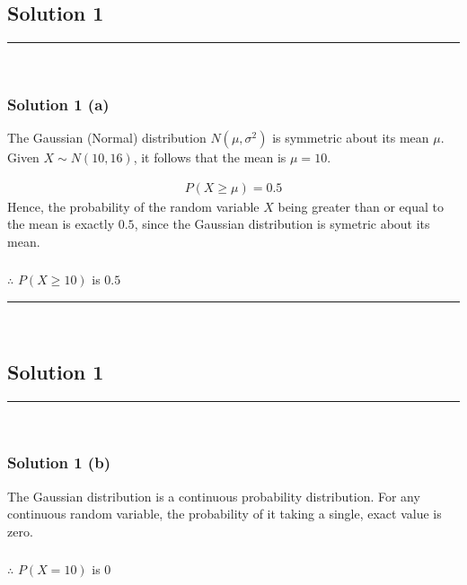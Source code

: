 \documentclass{article}
\begin{document}
\pagestyle{fancy}

\subsection*{Solution 1}
\noindent\rule{\textwidth}{0.4pt}\\
\subsubsection*{Solution 1 (a)}
The Gaussian (Normal) distribution $N(\mu, \sigma^2)$ is symmetric about its mean $\mu$. \\
Given $X \sim N(10, 16)$, it follows that the mean is $\mu = 10$.

\begin{align*}
    P(X \geq \mu) = 0.5
\end{align*}
Hence, the probability of the random variable $X$ being greater than or equal to the mean is exactly $0.5$, since the Gaussian distribution is symetric about its mean.

\subsubsection*{\normalfont}{$\therefore$ $P(X \geq 10)$ is $0.5$} \\

\noindent\rule{\textwidth}{0.4pt}\\

\newpage

\subsection*{Solution 1}
\noindent\rule{\textwidth}{0.4pt}\\
\subsubsection*{Solution 1 (b)}
The Gaussian distribution is a continuous probability distribution. For any continuous random variable, the probability of it taking a single, exact value is zero.

\subsubsection*{\normalfont}{$\therefore$ $P(X = 10)$ is $0$}
\end{document}
